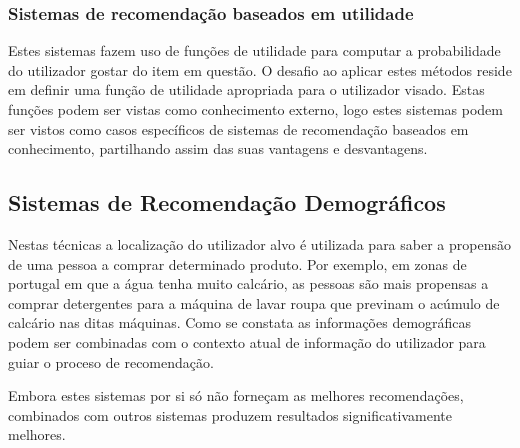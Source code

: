 \hfill
\subsubsection{Sistemas de recomendação baseados em utilidade}
\hfill
\par Estes sistemas fazem uso de funções de utilidade para computar a probabilidade do utilizador gostar do item em questão. O desafio ao aplicar estes métodos reside em definir uma função de utilidade apropriada para o utilizador visado. Estas funções podem ser vistas como conhecimento externo, logo estes sistemas podem ser vistos como casos específicos de sistemas de recomendação baseados em conhecimento, partilhando assim das suas vantagens e desvantagens.

\hfill
\subsection{Sistemas de Recomendação Demográficos}\hfill


 \par Nestas técnicas a localização do utilizador alvo é utilizada para saber a propensão de uma pessoa a comprar determinado produto. Por exemplo, em zonas de portugal em que a água tenha muito calcário, as pessoas são mais propensas a comprar detergentes para a máquina de lavar roupa que previnam o acúmulo de calcário nas ditas máquinas. Como se constata as informações demográficas podem ser combinadas com o contexto atual de informação do utilizador para guiar o proceso de recomendação.
 \par Embora estes sistemas por si só não forneçam as melhores recomendações, combinados com outros sistemas produzem resultados significativamente melhores.
\hfill
